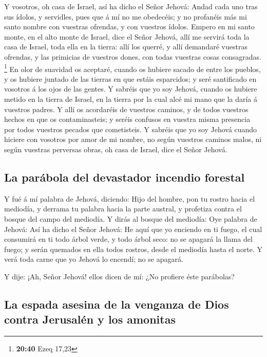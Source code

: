  Y vosotros, oh casa de Israel, así ha dicho el Señor
Jehová: Andad cada uno tras sus ídolos, y servidles, pues que á mí no me
obedecéis; y no profanéis más mi santo nombre con vuestras ofrendas, y
con vuestros ídolos.  Empero en mi santo monte, en el
alto monte de Israel, dice el Señor Jehová, allí me servirá toda la casa
de Israel, toda ella en la tierra: allí los querré, y allí demandaré
vuestras ofrendas, y las primicias de vuestros dones, con todas vuestras
cosas consagradas. \footnote{\textbf{20:40} Ezeq 17,23} 
En olor de suavidad os aceptaré, cuando os hubiere sacado de entre los
pueblos, y os hubiere juntado de las tierras en que estáis esparcidos; y
seré santificado en vosotros á los ojos de las gentes.  Y
sabréis que yo soy Jehová, cuando os hubiere metido en la tierra de
Israel, en la tierra por la cual alcé mi mano que la daría á vuestros
padres.  Y allí os acordaréis de vuestros caminos, y de
todos vuestros hechos en que os contaminasteis; y seréis confusos en
vuestra misma presencia por todos vuestros pecados que cometisteis.
 Y sabréis que yo soy Jehová cuando hiciere con vosotros
por amor de mi nombre, no según vuestros caminos malos, ni según
vuestras perversas obras, oh casa de Israel, dice el Señor Jehová.

\hypertarget{la-paruxe1bola-del-devastador-incendio-forestal}{%
\subsection{La parábola del devastador incendio
forestal}\label{la-paruxe1bola-del-devastador-incendio-forestal}}

 Y fué á mí palabra de Jehová, diciendo: 
Hijo del hombre, pon tu rostro hacia el mediodía, y derrama tu palabra
hacia la parte austral, y profetiza contra el bosque del campo del
mediodía.  Y dirás al bosque del mediodía: Oye palabra de
Jehová: Así ha dicho el Señor Jehová: He aquí que yo enciendo en ti
fuego, el cual consumirá en ti todo árbol verde, y todo árbol seco: no
se apagará la llama del fuego; y serán quemados en ella todos rostros,
desde el mediodía hasta el norte.  Y verá toda carne que
yo Jehová lo encendí; no se apagará.

 Y dije: ¡Ah, Señor Jehová! ellos dicen de mí: ¿No
profiere éste parábolas?

\hypertarget{la-espada-asesina-de-la-venganza-de-dios-contra-jerusaluxe9n-y-los-amonitas}{%
\subsection{La espada asesina de la venganza de Dios contra Jerusalén y
los
amonitas}\label{la-espada-asesina-de-la-venganza-de-dios-contra-jerusaluxe9n-y-los-amonitas}}

